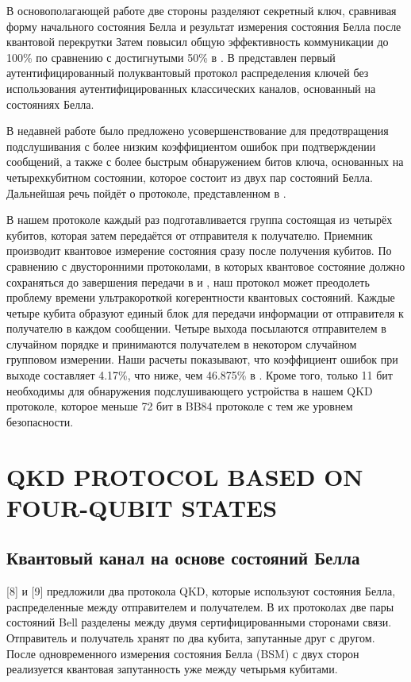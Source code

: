 \documentclass[a4paper,11pt]{article}
\begin{document}
В основополагающей работе \cite{Gao} две стороны разделяют секретный ключ, сравнивая форму начального состояния Белла и результат измерения состояния Белла после квантовой перекрутки %
Затем \cite{nine} повысил общую эффективность коммуникации до 100\% по сравнению с достигнутыми 50\% в \cite{Gao}. В \cite{ten} представлен первый аутентифицированный полуквантовый протокол распределения ключей без использования аутентифицированных классических каналов, основанный на состояниях Белла.

В недавней работе \cite{base} было предложено усовершенствование \cite{ten} для предотвращения подслушивания с более низким коэффициентом ошибок при подтверждении сообщений, а также с более быстрым обнаружением битов ключа, основанных на четырехкубитном состоянии, которое состоит из двух пар состояний Белла. Дальнейшая речь пойдёт о протоколе, представленном в \cite{base}.




В нашем протоколе каждый раз подготавливается группа состоящая из четырёх кубитов, которая затем передаётся от отправителя к получателю. Приемник производит квантовое измерение состояния сразу после получения кубитов. По сравнению с двусторонними протоколами, в которых квантовое состояние должно сохраняться до завершения передачи в \cite{Gao} и \cite{nine}, наш протокол может преодолеть проблему времени ультракороткой когерентности квантовых состояний. Каждые четыре кубита образуют единый блок для передачи информации от отправителя к получателю в каждом сообщении. Четыре выхода посылаются отправителем в случайном порядке и принимаются получателем в некотором случайном групповом измерении. Наши расчеты показывают, что коэффициент ошибок при выходе составляет 4.17\%, что ниже, чем 46.875\% в \cite{eleven}. Кроме того, только 11 бит необходимы для обнаружения подслушивающего устройства в нашем QKD протоколе, которое меньше 72 бит в BB84 протоколе \cite{BB84} с тем же уровнем безопасности.
\section{QKD PROTOCOL BASED ON FOUR-QUBIT STATES}

\subsection{Квантовый канал на основе состояний Белла}
[8] и [9] предложили два протокола QKD, которые используют состояния Белла, распределенные между отправителем и получателем. В их протоколах две пары состояний Bell разделены между двумя сертифицированными сторонами связи. Отправитель и получатель хранят по два кубита, запутанные друг с другом. После одновременного измерения состояния Белла (BSM) с двух сторон реализуется квантовая запутанность уже между четырьмя кубитами.
\end{document}
